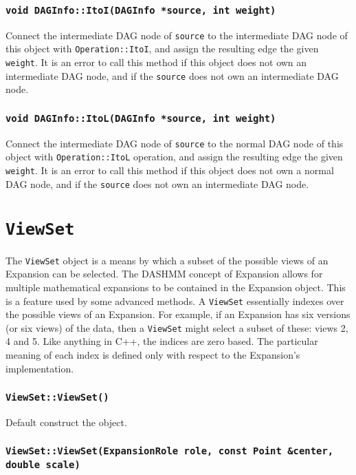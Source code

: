 \subsubsection{\texttt{void DAGInfo::ItoI(DAGInfo *source, int weight)}}

Connect the intermediate DAG node of \texttt{source} to the intermediate DAG
node of this object with \texttt{Operation::ItoI}, and assign the resulting
edge the given \texttt{weight}. It is an error to call this method if this
object does not own an intermediate DAG node, and if the \texttt{source} does
not own an intermediate DAG node.

\subsubsection{\texttt{void DAGInfo::ItoL(DAGInfo *source, int weight)}}

Connect the intermediate DAG node of \texttt{source} to the normal DAG node of 
this object with \texttt{Operation::ItoL} operation, and assign the resulting
edge the given \texttt{weight}. It is an error to call this method if this
object does not own a normal DAG node, and if the \texttt{source} does
not own an intermediate DAG node.



\section{\texttt{ViewSet}}

The \texttt{ViewSet} object is a means by which a subset of the possible views
of an Expansion can be selected. The DASHMM concept of Expansion allows for
multiple mathematical expansions to be contained in the Expansion object. This
is a feature used by some advanced methods. A \texttt{ViewSet} essentially
indexes over the possible views of an Expansion. For example, if an
Expansion has six versions (or six views) of the data, then a \texttt{ViewSet}
might select a subset of these: views 2, 4 and 5. Like anything in C++, the
indices are zero based. The particular meaning of each index is defined only
with respect to the Expansion's implementation.

\subsubsection{\texttt{ViewSet::ViewSet()}}

Default construct the object.

\subsubsection{\texttt{ViewSet::ViewSet(ExpansionRole role, const Point \&center, double scale)}}

